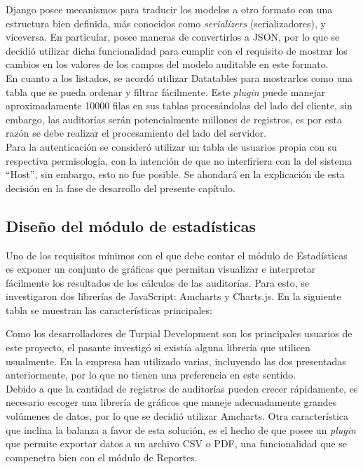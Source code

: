Django posee mecanismos para traducir los modelos a otro formato con una estructura bien definida, más conocidos como \textit{serializers} (serializadores), y viceversa. En particular, posee maneras de convertirlos a JSON, por lo que se decidió utilizar dicha funcionalidad para cumplir con el requisito de mostrar los cambios en los valores de los campos del modelo auditable en este formato.\\

En cuanto a los listados, se acordó utilizar Datatables para mostrarlos como una tabla que se pueda ordenar y filtrar fácilmente. Este \textit{plugin} puede manejar aproximadamente 10000 filas en sus tablas procesándolas del lado del cliente, sin embargo, las auditorías serán potencialmente millones de registros, es por esta razón se debe realizar el procesamiento del lado del servidor. \\

Para la autenticación se consideró utilizar un tabla de usuarios propia con su respectiva permisología, con la intención de que no interfiriera con la del sistema “Host”, sin embargo, esto no fue posible. Se ahondará en la explicación de esta decisión en la fase de desarrollo del presente capítulo.

\subsection{Diseño del módulo de estadísticas}

Uno de los requisitos mínimos con el que debe contar el módulo de Estadísticas es exponer un conjunto de gráficas que permitan visualizar e interpretar fácilmente los resultados de los cálculos de las auditorías. Para esto, se investigaron dos librerías de JavaScript: Amcharts y Charts.js. En la siguiente tabla se muestran las características principales:


Como los desarrolladores de Turpial Development son los principales usuarios de este proyecto, el pasante investigó si existía alguna librería que utilicen usualmente. En la empresa han utilizado varias, incluyendo las dos presentadas anteriormente, por lo que no tienen una preferencia en este sentido. \\

Debido a que la cantidad de registros de auditorías pueden crecer rápidamente, es necesario escoger una librería de gráficos que maneje adecuadamente grandes volúmenes de datos, por lo que se decidió utilizar Amcharts. Otra característica que inclina la balanza a favor de esta solución, es el hecho de que posee un \textit{plugin} que permite exportar datos a un archivo CSV o PDF, una funcionalidad que se compenetra bien con el módulo de Reportes. \\

